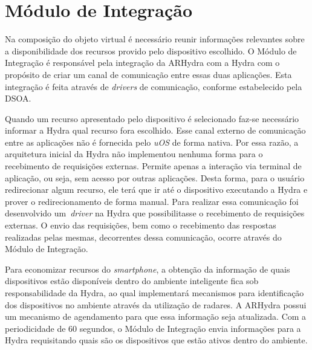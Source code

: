 \section{Módulo de Integração} 
\label{sec:modulo_integracao}

	Na composição do objeto virtual é necessário reunir informações relevantes sobre a disponibilidade dos 
	recursos provido pelo dispositivo escolhido. O Módulo de Integração é responsável pela integração da 
	ARHydra com a Hydra com o propósito de criar um canal de comunicação entre essas duas aplicações. Esta 
	integração é feita através de \textit{drivers} de comunicação, conforme	estabelecido pela DSOA. 
	
	Quando um recurso apresentado pelo dispositivo é selecionado faz-se necessário informar a Hydra	qual 
	recurso fora escolhido. Esse canal externo de comunicação entre as aplicações não é fornecida pelo 
	\textit{uOS} de forma nativa. Por essa razão, a arquitetura inicial da Hydra 
	não implementou nenhuma forma para o recebimento de requisições externas. Permite apenas a interação 
	via terminal de aplicação, ou seja, sem acesso por outras aplicações. Desta forma, para o usuário 
	redirecionar algum recurso, ele terá que ir até o dispositivo executando a Hydra e prover o 
	redirecionamento de forma manual. Para realizar essa comunicação foi desenvolvido um~\textit{driver} 
	na Hydra que possibilitasse o recebimento de requisições externas. O envio das requisições, bem como
	o recebimento das respostas realizadas pelas mesmas, decorrentes dessa comunicação, ocorre através do 
	Módulo de Integração.  

	Para economizar recursos do \textit{smartphone}, a obtenção da informação de quais dispositivos
	estão disponíveis dentro do ambiente inteligente fica sob responsabilidade da Hydra, ao qual implementará
	mecanismos para identificação dos dispositivos no ambiente através da utilização de radares. A ARHydra 
	possui um mecanismo de agendamento para que essa informação seja atualizada. Com a periodicidade de 60 segundos, 
	o Módulo de Integração envia informações para a Hydra requisitando quais são os dispositivos que estão 
	ativos dentro do ambiente.
	